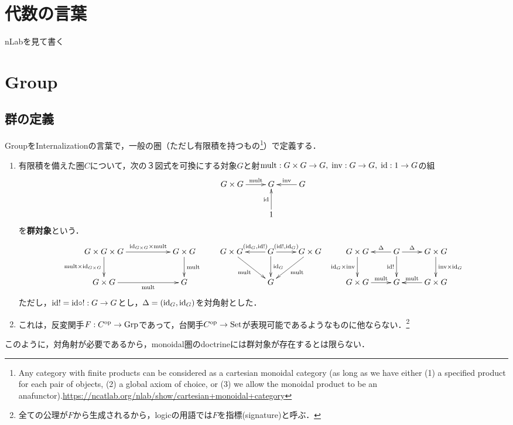 \documentclass[uplatex,dvipdfmx]{jsreport}
\begin{document}
\section{代数の言葉}

\begin{definition}
    nLabを見て書く
\end{definition}

\section{Group}

\subsection{群の定義}

\begin{tcolorbox}[colframe=ForestGreen, colback=ForestGreen!10!white, breakable ,colbacktitle=ForestGreen!40!white, coltitle=black,fonttitle=\bfseries\sffamily,
    title=]
    GroupをInternalizationの言葉で，一般の圏（ただし有限積を持つもの\footnote{Any category with finite products can be considered as a cartesian monoidal category (as long as we have either (1) a specified product for each pair of objects, (2) a global axiom of choice, or (3) we allow the monoidal product to be an anafunctor).\url{https://ncatlab.org/nlab/show/cartesian+monoidal+category}}）で定義する．
\end{tcolorbox}

\begin{definition}\mbox{}
    \begin{enumerate}
        \item 有限積を備えた圏$C$について，次の３図式を可換にする対象$G$と射$\mathrm{mult}:G\times G\to G,\;\mathrm{inv}:G\to G,\;\mathrm{id}:1\to G$の組
        \[\xymatrix{
            G\times G\ar[r]^-{\mult}&G&G\ar[l]_-{\inv}\\&1\ar[u]^-{\id}
        }\]
        を\textbf{群対象}という．
        \[\xymatrix{
            G\times G\times G\ar[rr]^-{{\scriptsize\id_{G\times G}\times\mult}}\ar[d]_-{\mult\times\id_{G\times G}}&&G\times G\ar[d]^-{\mult}&G\times G\ar[dr]_-{\mult}&G\ar[l]_-{(\id_G,\id!)}\ar[d]^-{\id_G}\ar[r]^-{(\id!,\id_G)}&G\times G\ar[dl]^-{\mult}&G\times G\ar[d]_-{\id_G\times\inv}&G\ar[l]_-{\Delta}\ar[r]^-{\Delta}\ar[d]_-{\id!}&G\times G\ar[d]^-{\inv\times\id_G}\\
            G\times G\ar[rr]_-{\mult}&&G&&G&&G\times G\ar[r]^-{\mult}&G&G\times G\ar[l]_-{\mult}
        }\]
        ただし，$\mathrm{id}!=\mathrm{id}\circ !:G\to G$とし，$\Delta=(\mathrm{id}_G,\mathrm{id}_G)$を対角射とした．
        \item これは，反変関手$F:C^{\mathrm{op}}\to\mathrm{Grp}$であって，台関手$C^{\mathrm{op}}\to\mathrm{Set}$が表現可能であるようなものに他ならない．\footnote{全ての公理が$F$から生成されるから，logicの用語では$F$を指標(signature)と呼ぶ．}
    \end{enumerate}
\end{definition}
\begin{remark}
    このように，対角射が必要であるから，monoidal圏のdoctrineには群対象が存在するとは限らない．
\end{remark}
\end{document}
